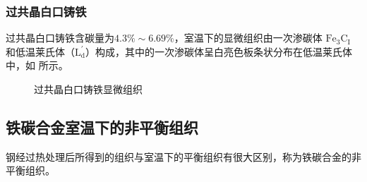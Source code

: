     \subsubsection{过共晶白口铸铁}
    过共晶白口铸铁含碳量为$4.3\%\sim 6.69\%$，室温下的显微组织由一次渗碳体 $\text{Fe}_3\text{C}_\text{I}$ 和低温莱氏体（$\text{L}_\text{d}^{'}$）构成，其中的一次渗碳体呈白亮色板条状分布在低温莱氏体中，如 所示。
    \begin{figure}[!ht]
        \hspace{20pt}
        \hspace{20pt}
        \caption{过共晶白口铸铁显微组织\label{fig:n7}}
    \end{figure}
    \newpage
    \subsection{铁碳合金室温下的非平衡组织}
    钢经过热处理后所得到的组织与室温下的平衡组织有很大区别，称为铁碳合金的非平衡组织。\par

